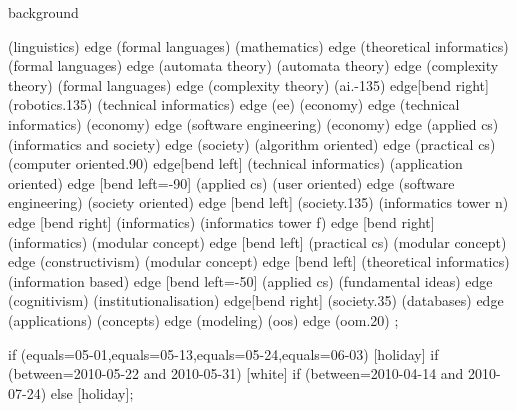 \documentclass[german,landscape]{article}
\begin{document}
\begin{map}
\begin{pgfonlayer}{background}
    \begin{scope}[line width=1mm,shorten <=2mm,shorten >=2mm,cap=round,draw=medium]
            (linguistics)             edge (formal languages)
            (mathematics)             edge (theoretical informatics)
            (formal languages)        edge (automata theory)
            (automata theory)         edge (complexity theory)
            (formal languages)        edge (complexity theory)
            (ai.-135)                 edge[bend right] (robotics.135)
            (technical informatics)   edge (ee)
            (economy)                 edge (technical informatics)
            (economy)                 edge (software engineering)
            (economy)                 edge (applied cs)
            (informatics and society) edge (society)
            (algorithm oriented)    edge  (practical cs)
            (computer oriented.90)     edge[bend left]  (technical informatics)
            (application oriented)  edge [bend left=-90] (applied cs)
            (user oriented)         edge (software engineering)
            (society oriented)      edge [bend left]  (society.135)
            (informatics tower n)   edge [bend right] (informatics)
            (informatics tower f)   edge [bend right] (informatics)
            (modular concept)       edge [bend left]  (practical cs)  
            (modular concept)       edge   (constructivism)		
            (modular concept)       edge [bend left]  (theoretical informatics)
            (information based)     edge [bend left=-50] (applied cs)
            (fundamental ideas)     edge   (cognitivism)		
            (institutionalisation)  edge[bend right] (society.35)
            (databases)             edge             (applications)
            (concepts)              edge (modeling)
            (oos)                   edge (oom.20) 
            ;
    \end{scope}
  \end{pgfonlayer}

  
  \begin{calendar left}
    \calendar [dates=2010-04-12 to 2010-07-last]
       if (equals=05-01,equals=05-13,equals=05-24,equals=06-03) [holiday]
       if (between=2010-05-22 and 2010-05-31) [white]
       if (between=2010-04-14 and 2010-07-24) {} else [holiday];


\end{calendar left}
\end{map}
\end{document}
